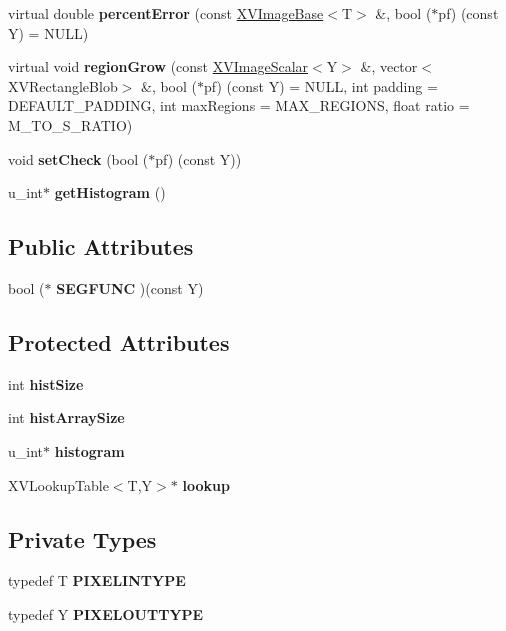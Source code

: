 \begin{CompactItemize}
\item 
\label{XVSegmentation_a6}
\hypertarget{class_XVSegmentation_a6}{
virtual double {\bf percent\-Error} (const \hyperlink{class_XVImageBase}{XVImage\-Base}$<$T$>$ \&, bool ($\ast$pf) (const Y) = NULL)}

\item 
\label{XVSegmentation_a7}
\hypertarget{class_XVSegmentation_a7}{
virtual void {\bf region\-Grow} (const \hyperlink{class_XVImageScalar}{XVImage\-Scalar}$<$Y$>$ \&, vector$<$XVRectangle\-Blob$>$ \&, bool ($\ast$pf) (const Y) = NULL, int padding = DEFAULT\_\-PADDING, int max\-Regions = MAX\_\-REGIONS, float ratio = M\_\-TO\_\-S\_\-RATIO)}

\item 
void {\bf set\-Check} (bool ($\ast$pf) (const Y))
\item 
u\_\-int$\ast$ {\bf get\-Histogram} ()
\end{CompactItemize}
\subsection*{Public Attributes}
\begin{CompactItemize}
\item 
\label{XVSegmentation_m0}
\hypertarget{class_XVSegmentation_m0}{
bool ($\ast$ {\bf SEGFUNC} )(const Y)}

\end{CompactItemize}
\subsection*{Protected Attributes}
\begin{CompactItemize}
\item 
int {\bf hist\-Size}
\item 
int {\bf hist\-Array\-Size}
\item 
u\_\-int$\ast$ {\bf histogram}
\item 
XVLookup\-Table$<$T,Y$>$$\ast$ {\bf lookup}
\end{CompactItemize}
\subsection*{Private Types}
\begin{CompactItemize}
\item 
typedef T {\bf PIXELINTYPE}
\item 
typedef Y {\bf PIXELOUTTYPE}
\end{CompactItemize}


